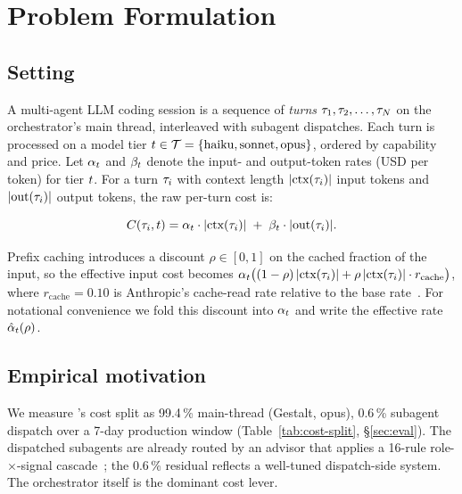 \section{Problem Formulation}
\label{sec:problem}

\subsection{Setting}

A multi-agent LLM coding session is a sequence of \emph{turns}
\(\tau_1, \tau_2, \ldots, \tau_N\) on the orchestrator's main
thread, interleaved with subagent dispatches.  Each turn is processed
on a model tier \(t \in \mathcal{T} = \{\text{haiku}, \text{sonnet},
\text{opus}\}\), ordered by capability and price.  Let
\(\alpha_{t}\) and \(\beta_{t}\) denote the input- and
output-token rates (USD per token) for tier \(t\).  For a turn
\(\tau_i\) with context length \(|\text{ctx}(\tau_i)|\) input tokens
and \(|\text{out}(\tau_i)|\) output tokens, the raw per-turn cost is:

\begin{equation}
  C(\tau_i, t) =
    \alpha_{t} \cdot |\text{ctx}(\tau_i)| \;+\;
    \beta_{t} \cdot |\text{out}(\tau_i)|.
  \label{eq:perturn}
\end{equation}

Prefix caching introduces a discount \(\rho \in [0,1]\) on the cached
fraction of the input, so the effective input cost becomes
\(\alpha_{t}\bigl((1-\rho)\,|\text{ctx}(\tau_i)| +
\rho\,|\text{ctx}(\tau_i)| \cdot r_{\text{cache}}\bigr)\), where
\(r_{\text{cache}} = 0.10\) is Anthropic's cache-read rate
relative to the base rate~\cite{anthropic-cache}.  For notational
convenience we fold this discount into \(\alpha_{t}\) and write
the effective rate \(\hat\alpha_{t}(\rho)\).

\subsection{Empirical motivation}

We measure \blackrim's cost split as 99.4\,\% main-thread (Gestalt,
opus), 0.6\,\% subagent dispatch over a 7-day production window
(Table~\ref{tab:cost-split}, §\ref{sec:eval}).  The dispatched
subagents are already routed by an advisor that applies a 16-rule
role-\(\times\)-signal cascade~\cite{moa1landscape}; the 0.6\,\%
residual reflects a well-tuned dispatch-side system.  The orchestrator
itself is the dominant cost lever.


